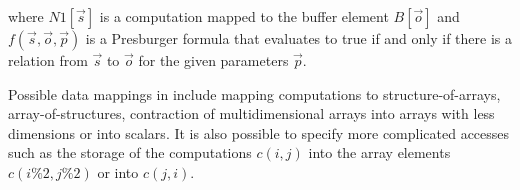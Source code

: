 \noindent where $N1[\vec{s}]$ is a computation mapped to the buffer element $B[\vec{o}]$ and $f(\vec{s}, \vec{o}, \vec{p})$ is a Presburger formula that evaluates to true if and only if there is a relation from $\vec{s}$ to $\vec{o}$ for the given parameters $\vec{p}$.

Possible data mappings in \framework include mapping computations to structure-of-arrays, array-of-structures, contraction of multidimensional arrays into arrays with less dimensions or into scalars.  It is also possible to specify more complicated accesses such as the storage of the computations $c(i,j)$ into the array elements $c(i\%2,j\%2)$ or into $c(j,i)$.

